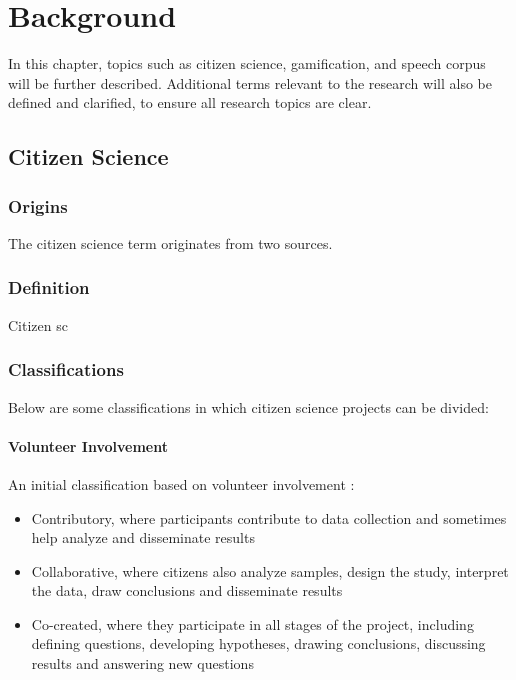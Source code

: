 \chapter{Background}

In this chapter, topics such as citizen science, gamification, and speech corpus will be further described. Additional terms relevant to the research will also be defined and clarified, to ensure all research topics are clear. 

\section{Citizen Science}

\subsection{Origins}

The citizen science term originates from two sources.

\subsection{Definition}

Citizen sc

\subsection{Classifications}

Below are some classifications in which citizen science projects can be divided:

\subsubsection{Volunteer Involvement}

An initial classification based on volunteer involvement \cite{follett2015analysis}: 
\begin{itemize}
    \item Contributory, where participants contribute to data collection and sometimes help analyze and disseminate results
    \item Collaborative, where citizens also analyze samples, design the study, interpret the data, draw conclusions and disseminate results
    \item Co-created, where they participate in all stages of the project, including defining questions, developing hypotheses, drawing conclusions, discussing results and answering new questions
\end{itemize}

